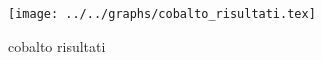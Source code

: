 \begin{figure}[h] \centering\texttt{[image: ../../graphs/cobalto\_risultati.tex]}\caption{cobalto risultati}\label{gr:cobalto_risultati} \end{figure}
